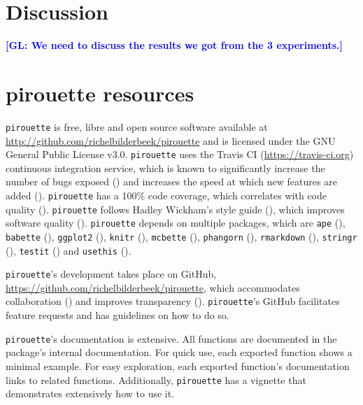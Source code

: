 \documentclass{article}
\newcommand{\giovanni}[1]{\textcolor{blue}{\textbf{[GL: #1]}}}
\begin{document}
\section{Discussion}
\giovanni{We need to discuss the results we got from the 3 experiments.}

\section{pirouette resources}

\verb;pirouette; is free, libre and open source software available at 
\url{http://github.com/richelbilderbeek/pirouette}
and is licensed under the GNU General Public License v3.0.
\verb;pirouette; uses the Travis CI (\url{https://travis-ci.org})
continuous integration service, which is known to significantly 
increase the number of bugs exposed (\cite{vasilescu2015}) and increases
the speed at which new features are added (\cite{vasilescu2015}).
\verb;pirouette; has a 100\% code coverage, which correlates with 
code quality (\cite{horgan1994,del1995correlation}). 
\verb;pirouette; follows Hadley Wickham's style guide (\cite{style_guide}), 
which improves software quality (\cite{fang2001}).
\verb;pirouette; depends on multiple packages, which are 
\verb;ape; (\cite{APE}), 
\verb;babette; (\cite{bilderbeek2018babette}),
\verb;ggplot2; (\cite{ggplot2}),
\verb;knitr; (\cite{knitr}),
\verb;mcbette; (\cite{mcbette}),
\verb;phangorn; (\cite{phangorn}),
\verb;rmarkdown; (\cite{rmarkdown}),
\verb;stringr; (\cite{stringr}),
\verb;testit; (\cite{testit}) and 
\verb;usethis; (\cite{usethis}).

\verb;pirouette;'s development takes place on GitHub,
\url{https://github.com/richelbilderbeek/pirouette}, 
which accommodates collaboration (\cite{perez2016ten}) 
and improves transparency (\cite{gorgolewski2016practical}).
\verb;pirouette;'s GitHub facilitates feature requests and 
has guidelines on how to do so.

\verb;pirouette;'s documentation is extensive. All functions are documented
in the package's internal documentation. For quick use, 
each exported function shows a minimal example. 
For easy exploration, each exported function's documentation links to related functions.
Additionally, \verb;pirouette; has a vignette that demonstrates extensively how
to use it. 
\end{document}
